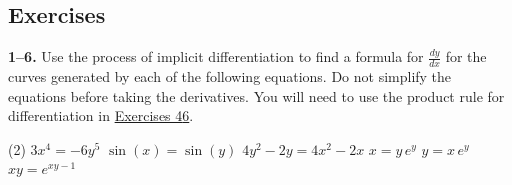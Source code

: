 \documentclass[10pt,oneside,]{book}
\theoremstyle{plain}
\theoremstyle{definition}
\numberwithin{equation}{section}
\newcommand{\fe}[2]{#1\mathopen{}\left(#2\right)\mathclose{}}
\newcommand{\lz}[2]{\frac{d#1}{d#2}}
\begin{document}
\subsection[Exercises]{Exercises}\label{exercises-48}
\textbf{1--6. }\hypertarget{exercisegroup-104}{\null}Use the process of implicit differentiation to find a formula for \(\lz{y}{x}\) for the curves generated by each of the following equations. Do not simplify the equations before taking the derivatives. You will need to use the product rule for differentiation in \hyperlink{exercise-implicit-middle}{Exercises 4}\textendash{}\hyperlink{exercise-implicit-last}{6}.%
\par
\begin{exercisegroup}(2)
\exercise[1.]\hypertarget{exercise-522}{\null}\(3x^4=-6y^5\)%
\exercise[2.]\hypertarget{exercise-523}{\null}\(\fe{\sin}{x}=\fe{\sin}{y}\)%
\exercise[3.]\hypertarget{exercise-524}{\null}\(4y^2-2y=4x^2-2x\)%
\exercise[4.]\hypertarget{exercise-implicit-middle}{\null}\(x=y\,e^y\)%
\exercise[5.]\hypertarget{exercise-implicit-lambert}{\null}\(y=x\,e^y\)%
\exercise[6.]\hypertarget{exercise-implicit-last}{\null}\(xy=e^{xy-1}\)%
\end{exercisegroup}
\par\smallskip\noindent
\end{document}
